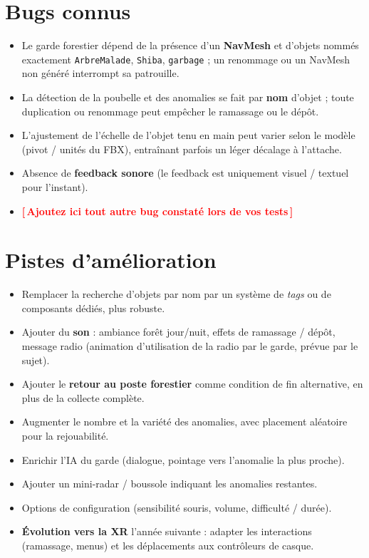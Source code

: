 \documentclass[11pt,a4paper]{article}
\newcommand{\todo}[1]{\textcolor{red}{\textbf{[\,#1\,]}}}
\begin{document}
\section{Bugs connus}
\begin{itemize}
  \item Le garde forestier dépend de la présence d'un \textbf{NavMesh} et
        d'objets nommés exactement \texttt{ArbreMalade}, \texttt{Shiba},
        \texttt{garbage} ; un renommage ou un NavMesh non généré interrompt sa
        patrouille.
  \item La détection de la poubelle et des anomalies se fait par \textbf{nom}
        d'objet ; toute duplication ou renommage peut empêcher le ramassage ou le
        dépôt.
  \item L'ajustement de l'échelle de l'objet tenu en main peut varier selon le
        modèle (pivot / unités du FBX), entraînant parfois un léger décalage à
        l'attache.
  \item Absence de \textbf{feedback sonore} (le feedback est uniquement visuel /
        textuel pour l'instant).
  \item \todo{Ajoutez ici tout autre bug constaté lors de vos tests}
\end{itemize}

\section{Pistes d'amélioration}
\begin{itemize}
  \item Remplacer la recherche d'objets par nom par un système de \emph{tags} ou
        de composants dédiés, plus robuste.
  \item Ajouter du \textbf{son} : ambiance forêt jour/nuit, effets de ramassage /
        dépôt, message radio (animation d'utilisation de la radio par le garde,
        prévue par le sujet).
  \item Ajouter le \textbf{retour au poste forestier} comme condition de fin
        alternative, en plus de la collecte complète.
  \item Augmenter le nombre et la variété des anomalies, avec placement aléatoire
        pour la rejouabilité.
  \item Enrichir l'IA du garde (dialogue, pointage vers l'anomalie la plus proche).
  \item Ajouter un mini-radar / boussole indiquant les anomalies restantes.
  \item Options de configuration (sensibilité souris, volume, difficulté / durée).
  \item \textbf{Évolution vers la XR} l'année suivante : adapter les interactions
        (ramassage, menus) et les déplacements aux contrôleurs de casque.
\end{itemize}
\end{document}
